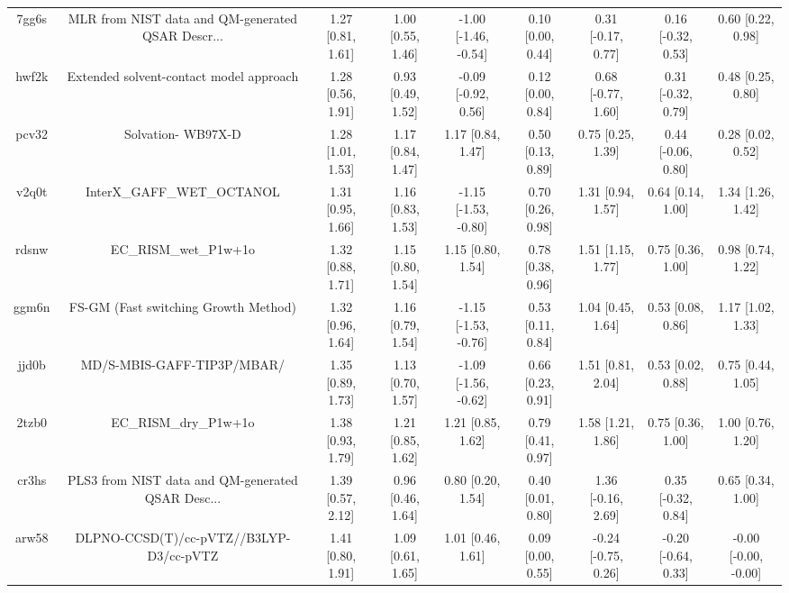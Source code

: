 \documentclass{article}
\begin{document}
\begin{center}
\begin{longtable}{|ccccccccc|}
 7gg6s &  MLR from NIST data and QM-generated QSAR Descr... &  1.27 [0.81, 1.61] &  1.00 [0.55, 1.46] &  -1.00 [-1.46, -0.54] &  0.10 [0.00, 0.44] &   0.31 [-0.17, 0.77] &   0.16 [-0.32, 0.53] &     0.60 [0.22, 0.98] \\
 hwf2k &            Extended solvent-contact model approach &  1.28 [0.56, 1.91] &  0.93 [0.49, 1.52] &   -0.09 [-0.92, 0.56] &  0.12 [0.00, 0.84] &   0.68 [-0.77, 1.60] &   0.31 [-0.32, 0.79] &     0.48 [0.25, 0.80] \\
 pcv32 &                                 Solvation- WB97X-D &  1.28 [1.01, 1.53] &  1.17 [0.84, 1.47] &     1.17 [0.84, 1.47] &  0.50 [0.13, 0.89] &    0.75 [0.25, 1.39] &   0.44 [-0.06, 0.80] &     0.28 [0.02, 0.52] \\
 v2q0t &                         InterX\_GAFF\_WET\_OCTANOL &  1.31 [0.95, 1.66] &  1.16 [0.83, 1.53] &  -1.15 [-1.53, -0.80] &  0.70 [0.26, 0.98] &    1.31 [0.94, 1.57] &    0.64 [0.14, 1.00] &     1.34 [1.26, 1.42] \\
 rdsnw &                              EC\_RISM\_wet\_P1w+1o &  1.32 [0.88, 1.71] &  1.15 [0.80, 1.54] &     1.15 [0.80, 1.54] &  0.78 [0.38, 0.96] &    1.51 [1.15, 1.77] &    0.75 [0.36, 1.00] &     0.98 [0.74, 1.22] \\
 ggm6n &               FS-GM (Fast switching Growth Method) &  1.32 [0.96, 1.64] &  1.16 [0.79, 1.54] &  -1.15 [-1.53, -0.76] &  0.53 [0.11, 0.84] &    1.04 [0.45, 1.64] &    0.53 [0.08, 0.86] &     1.17 [1.02, 1.33] \\
 jjd0b &                         MD/S-MBIS-GAFF-TIP3P/MBAR/ &  1.35 [0.89, 1.73] &  1.13 [0.70, 1.57] &  -1.09 [-1.56, -0.62] &  0.66 [0.23, 0.91] &    1.51 [0.81, 2.04] &    0.53 [0.02, 0.88] &     0.75 [0.44, 1.05] \\
 2tzb0 &                              EC\_RISM\_dry\_P1w+1o &  1.38 [0.93, 1.79] &  1.21 [0.85, 1.62] &     1.21 [0.85, 1.62] &  0.79 [0.41, 0.97] &    1.58 [1.21, 1.86] &    0.75 [0.36, 1.00] &     1.00 [0.76, 1.20] \\
 cr3hs &  PLS3 from NIST data and QM-generated QSAR Desc... &  1.39 [0.57, 2.12] &  0.96 [0.46, 1.64] &     0.80 [0.20, 1.54] &  0.40 [0.01, 0.80] &   1.36 [-0.16, 2.69] &   0.35 [-0.32, 0.84] &     0.65 [0.34, 1.00] \\
 arw58 &            DLPNO-CCSD(T)/cc-pVTZ//B3LYP-D3/cc-pVTZ &  1.41 [0.80, 1.91] &  1.09 [0.61, 1.65] &     1.01 [0.46, 1.61] &  0.09 [0.00, 0.55] &  -0.24 [-0.75, 0.26] &  -0.20 [-0.64, 0.33] &  -0.00 [-0.00, -0.00] \\

\end{longtable}
\end{center}
\end{document}
